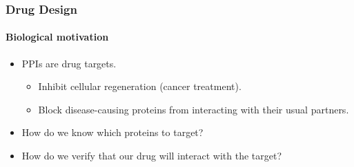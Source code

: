 \begin{frame}[fragile]
  \frametitle{Drug Design}
  \framesubtitle{Biological motivation}
      \vspace{-2em}
      \begin{itemize}
        \item<1-> PPIs are drug targets.
              \begin{itemize}
                \item Inhibit cellular regeneration (cancer treatment).
                \item Block disease-causing proteins from interacting with their usual partners.
              \end{itemize}
        \item<2-> How do we know which proteins to target?
        \item<3-> How do we verify that our drug will interact with the target?
      \end{itemize}
\end{frame}


